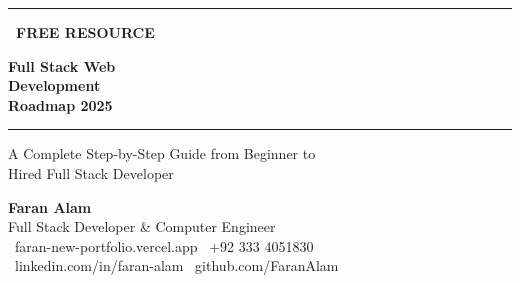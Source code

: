 \documentclass[12pt,a4paper]{article}
\begin{document}

\begin{titlepage}
    \pagecolor{FaranDark}
    \color{white}
    \centering
    \vspace*{2cm}

    {\color{FaranBlue}\rule{\textwidth}{3pt}}
    \vspace{1cm}

    \begin{tcolorbox}[
        colback=FaranBlue,
        colframe=FaranBlue,
        width=0.4\textwidth,
        arc=20pt,
        boxrule=0pt,
        halign=center
    ]
        \centering\color{white}\textbf{\faCode~FREE RESOURCE}
    \end{tcolorbox}

    \vspace{1cm}

    {\fontsize{36}{44}\selectfont\textbf{Full Stack Web}}\\[0.3cm]
    {\fontsize{36}{44}\selectfont\textbf{Development}}\\[0.3cm]
    {\fontsize{40}{48}\selectfont\color{FaranBlue}\textbf{Roadmap 2025}}

    \vspace{1cm}
    {\color{FaranGray}\rule{0.6\textwidth}{1pt}}
    \vspace{0.5cm}

    {\large A Complete Step-by-Step Guide from Beginner to}\\[0.2cm]
    {\large Hired Full Stack Developer}

    \vspace{2cm}

    \begin{tcolorbox}[
        colback=white!10,
        colframe=FaranBlue,
        width=0.65\textwidth,
        arc=8pt,
        boxrule=1.5pt,
        halign=center,
        valign=center
    ]
        \centering
        {\large\textbf{\color{white}Faran Alam}}\\[0.2cm]
        {\color{FaranLight}Full Stack Developer \& Computer Engineer}\\[0.3cm]
        {\small\color{FaranLight}\faGlobe~faran-new-portfolio.vercel.app \quad \faWhatsapp~+92 333 4051830}\\
        {\small\color{FaranLight}\faLinkedin~linkedin.com/in/faran-alam \quad \faGithub~github.com/FaranAlam}
    \end{tcolorbox}


\end{titlepage}
\end{document}
